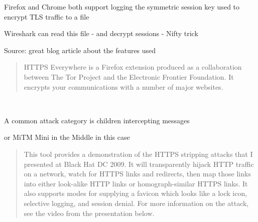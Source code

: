 \documentclass[Screen16to9,17pt]{foils}
\begin{document}

\begin{list1}
\item  Firefox and Chrome both support logging the symmetric session key used to encrypt TLS traffic to a file
\item Wireshark can read this file - and decrypt sessions - Nifty trick
\end{list1}


Source: great blog article about the features used\\
{\tiny{}}




\begin{quote}
HTTPS Everywhere is a Firefox extension produced as a collaboration between The Tor Project and the Electronic Frontier Foundation. It encrypts your communications with a number of major websites.
\end{quote}

\centerline{}



{~}

\begin{list2}
\item A common attack category is children intercepting messages
\item or MiTM Mini in the Middle in this case
\end{list2}



\begin{quote}
This tool provides a demonstration of the HTTPS stripping attacks that I presented at Black Hat DC 2009. It will transparently hijack HTTP traffic on a network, watch for HTTPS links and redirects, then map those links into either look-alike HTTP links or homograph-similar HTTPS links. It also supports modes for supplying a favicon which looks like a lock icon, selective logging, and session denial. For more information on the attack, see the video from the presentation below.
\end{quote}

\end{document}
